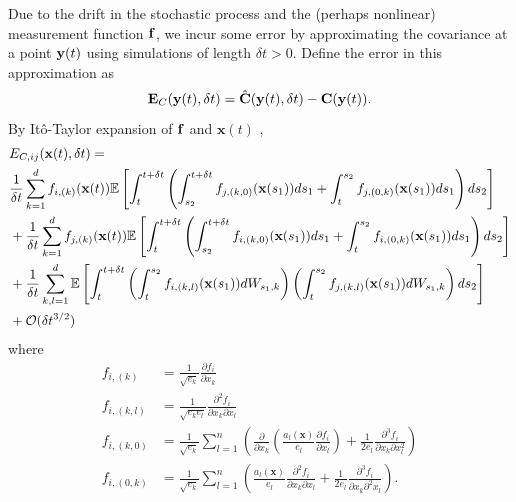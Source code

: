 Due to the drift in the stochastic process and the (perhaps nonlinear) measurement function $\mathbf{f}$, we incur some error by approximating the covariance at a point $\mathbf{y}(t)$ using simulations of length $\delta t > 0$.
%
Define the error in this approximation as
\begin{equation}
\mathbf{E}_C(\mathbf{y}(t), \delta t) = \hat{\mathbf{C}}(\mathbf{y}(t), \delta t) - \mathbf{C}(\mathbf{y}(t)).
\end{equation}
%
%
By It\^{o}-Taylor expansion of $\mathbf{f}$ and $\mathbf{x}(t)$ \cite{kloeden1992numerical},
%
\begin{equation} \label{eq:cov_error}
\begin{aligned}
& E_{C, ij} (\mathbf{x}(t), \delta t) = \\
 & \frac{1}{\delta t} \sum_{k=1}^d f_{i,(k)}(\mathbf{x}(t)) \mathbb{E} \left[ \int_t^{t+\delta t} \left( \int_{s_2}^{t+\delta t} f_{j,(k,0)}(\mathbf{x}(s_1)) ds_1
+ \int_t^{s_2} f_{j,(0,k)}(\mathbf{x}(s_1)) ds_1 \right) ds_2 \right] \\
&+  \frac{1}{\delta t} \sum_{k=1}^d f_{j,(k)}(\mathbf{x}(t))  \mathbb{E} \left[ \int_t^{t+\delta t} \left( \int_{s_2}^{t + \delta t} f_{i,(k,0)}(\mathbf{x}(s_1)) ds_1
+  \int_t^{s_2} f_{i,(0,k)}(\mathbf{x}(s_1)) ds_1 \right) ds_2 \right] \\
&+  \frac{1}{\delta t} \sum_{k,l=1}^d \mathbb{E} \left[ \int_t^{t+\delta t}\left( \int_t^{s_2} f_{i,(k,l)}(\mathbf{x}(s_1)) dW_{s_1, k}  \right) \left(  \int_t^{s_2} f_{j,(k,l)}(\mathbf{x}(s_1)) dW_{s_1, k} \right) ds_2 \right] \\
&+ \mathcal{O} (\delta t^{3/2})
\end{aligned}
\end{equation}
%
where
\begin{equation}
\begin{aligned}
f_{i,(k)} &= \frac{1}{\sqrt{e_k}} \frac{\partial f_i}{\partial x_k}
\\
f_{i,(k,l)} &= \frac{1}{\sqrt{e_k e_l}} \frac{\partial^2 f_i}{\partial x_k \partial x_l}
\\
f_{i,(k,0)} &= \frac{1}{\sqrt{e_k}} \sum_{l=1}^n \left( \frac{\partial}{\partial x_k} \left( \frac{a_l(\mathbf{x})}{e_l} \frac{\partial f_i}{\partial x_l} \right) + \frac{1}{2 e_l} \frac{\partial^3 f_i}{\partial x_k \partial x_l^2} \right)
\\
f_{i,(0, k)} &= \frac{1}{\sqrt{e_k}} \sum_{l=1}^n \left( \frac{a_l(\mathbf{x})}{e_l} \frac{\partial^2 f_i}{\partial x_k \partial x_l} +\frac{1}{2 e_l}  \frac{\partial^3 f_i}{\partial x_k \partial^2 x_l} \right).
\end{aligned}
\end{equation}
